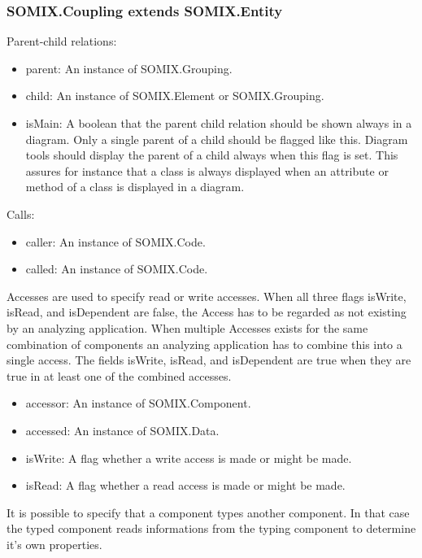 \documentclass[preprint,12pt]{elsarticle}
\begin{document}
\subsubsection{SOMIX.Coupling extends SOMIX.Entity}

Parent-child relations:

\begin{itemize}
\item parent: An instance of SOMIX.Grouping.
\item child: An instance of SOMIX.Element or SOMIX.Grouping.
\item isMain: A boolean that the parent child relation should be shown always in a diagram. Only a single parent of a child should be flagged like this. Diagram tools should display the parent of a child always when this flag is set. This assures for instance that a class is always displayed when an attribute or method of a class is displayed in a diagram.
\end{itemize}


Calls:

\begin{itemize}
\item caller: An instance of SOMIX.Code.
\item called: An instance of SOMIX.Code.
\end{itemize}

Accesses are used to specify read or write accesses. When all three flags isWrite, isRead, and isDependent are false, the Access has to be regarded as not existing by an analyzing application. When multiple Accesses exists for the same combination of components an analyzing application has to combine this into a single access. The fields isWrite, isRead, and isDependent are true when they are true in at least one of the combined accesses.

\begin{itemize}
\item accessor: An instance of SOMIX.Component.
\item accessed: An instance of SOMIX.Data.
\item isWrite: A flag whether a write access is made or might be made.
\item isRead: A flag whether a read access is made or might be made. 
\end{itemize}

It is possible to specify that a component types another component.
In that case the typed component reads informations from the typing component to determine it's own properties.
\end{document}
